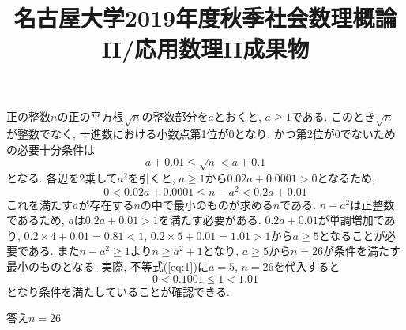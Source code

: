 \documentclass{jarticle}
\title{名古屋大学2019年度秋季社会数理概論II/応用数理II成果物}
\author{}
\date{}
\numberwithin{equation}{answer}
\begin{document}
\maketitle











正の整数$n$の正の平方根$\sqrt{n}$の整数部分を$a$とおくと, $a \ge 1$である. このとき$\sqrt{n}$が整数でなく, 十進数における小数点第1位が0となり, かつ第2位が0でないための必要十分条件は
\begin{equation*}
 a+0.01 \le \sqrt{n} < a+0.1
\end{equation*}
となる. 各辺を2乗して$a^2$を引くと, $a \ge 1$から$0.02a+0.0001>0$となるため, 
\begin{equation}
 0 < 0.02a+0.0001 \le n-a^{2} < 0.2a+0.01
\label{eq:1}
\end{equation}
これを満たす$a$が存在する$n$の中で最小のものが求める$n$である. 
$n-a^{2}$は正整数であるため, $a$は$0.2a+0.01>1$を満たす必要がある. 
$0.2a+0.01$が単調増加であり, $0.2 \times 4+0.01=0.81<1$, $0.2 \times 5+0.01=1.01>1$から$a \ge 5$となることが必要である. 
また$n-a^2 \ge 1$より$n \ge a^2 +1$となり, $a \ge 5$から$n=26$が条件を満たす最小のものとなる. 
実際, 不等式(\ref{eq:1})に$a=5$, $n=26$を代入すると
\begin{equation*}
 0 < 0.1001 \le 1 < 1.01
\end{equation*}
となり条件を満たしていることが確認できる. 
\begin{flushright}
 答え$n=26$
\end{flushright}
\end{document}
